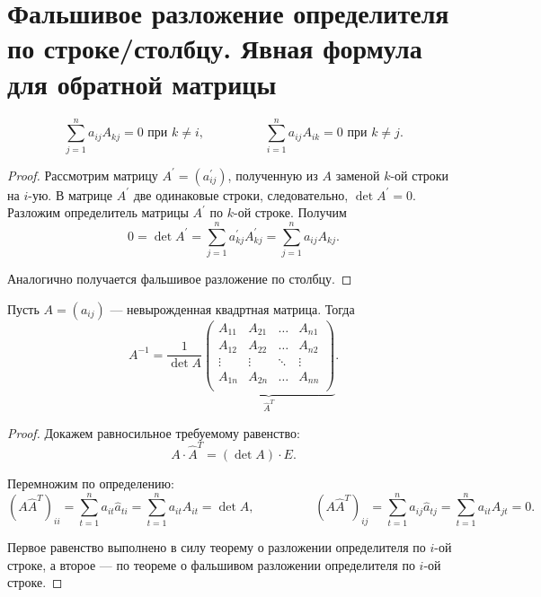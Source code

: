\section{Фальшивое разложение определителя по строке/столбцу. Явная формула для обратной матрицы}

\begin{theorem}
    $$
    \sum_{j = 1}^na_{ij}A_{kj} = 0\text{{} при $k \ne i$},\hspace{2cm}\sum_{i = 1}^n a_{ij}A_{ik} = 0\text{{} при $k \ne j$}.
    $$
\end{theorem}

\begin{proof}
    Рассмотрим матрицу $A^\prime = (a^\prime_{ij})$, полученную из $A$ заменой $k$-ой строки на $i$-ую. В матрице $A^\prime$ две одинаковые строки, следовательно, $\det A^\prime = 0$. Разложим определитель матрицы $A^\prime$ по $k$-ой строке. Получим
    $$
    0 = \det A^\prime = \sum_{j = 1}^n a^\prime_{kj}A^\prime_{kj} = \sum_{j = 1}^n a_{ij}A_{kj}.
    $$

    Аналогично получается фальшивое разложение по столбцу.
\end{proof}

\begin{theorem}
    Пусть $A = (a_{ij})$ --- невырожденная квадртная матрица. Тогда
    $$
    A^{-1} = \frac{1}{\det A}
    \underbrace{
    \begin{pmatrix}
        A_{11} & A_{21} & \ldots & A_{n1}\\
        A_{12} & A_{22} & \ldots & A_{n2}\\
        \vdots & \vdots & \ddots & \vdots\\
        A_{1n} & A_{2n} & \ldots & A_{nn}\\
    \end{pmatrix}}_{\widehat{A}^T}.
    $$
\end{theorem}

\begin{proof}
    Докажем равносильное требуемому равенство:
    $$
    A \cdot \widehat{A}^T = (\det A) \cdot E.
    $$

    Перемножим по определению:
    $$
    (A\widehat{A}^T)_{ii} = \sum_{t = 1}^n a_{it}\widehat{a}_{ti} = \sum_{t = 1}^n a_{it}A_{it} = \det A,\hspace{2cm}
    (A\widehat{A}^T)_{ij} = \sum_{t = 1}^n a_{ij}\widehat{a}_{tj} = \sum_{t = 1}^n a_{it}A_{jt} = 0.
    $$

    Первое равенство выполнено в силу теорему о разложении определителя по $i$-ой строке, а второе --- по теореме о фальшивом разложении определителя по $i$-ой строке.
\end{proof}

